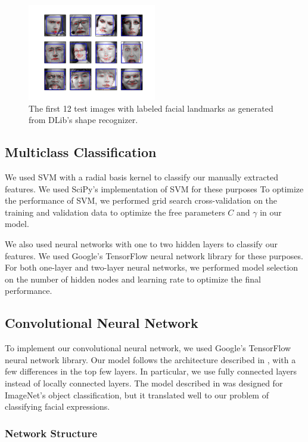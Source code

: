 \documentclass[10pt, twocolumn, twoside]{article}
\begin{document}
\begin{figure}[!htbp]
\centering
\includegraphics[width=0.5\textwidth]{landmarks}
\caption{\label{fig:landmarks} The first 12 test images with labeled facial landmarks
as generated from DLib's shape recognizer.}
\end{figure}

\subsection{Multiclass Classification}

We used SVM with a radial basis kernel to classify our manually
extracted features. We used SciPy's implementation of SVM for these purposes
To optimize the performance of SVM, we performed grid
search cross-validation on the training and validation data to optimize the
free parameters $C$ and $\gamma$ in our model.

We also used neural networks with one to two hidden layers to classify
our features. We used Google's TensorFlow neural network library for these
purposes. For both one-layer and two-layer neural networks, we performed 
model selection on the number of hidden nodes and learning rate to optimize
the final performance.

\subsection{Convolutional Neural Network}

To implement our convolutional neural network, we used Google's TensorFlow neural network library.
Our model follows the architecture described in \cite{Krizhevsky}, with a few differences in the top few layers.
In particular, we use fully connected layers instead of locally connected layers. The model described in
\cite{Krizhevsky} was designed for ImageNet's object classification, but it translated well to our problem of classifying facial expressions.

\subsubsection{Network Structure}
\end{document}
